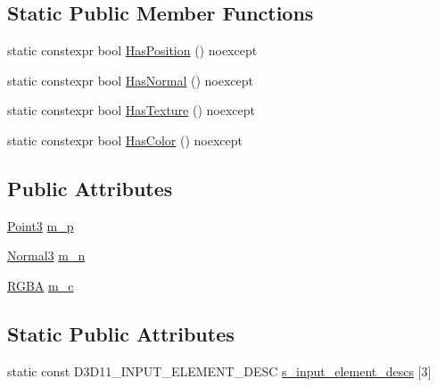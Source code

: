 \subsection*{Static Public Member Functions}
\begin{DoxyCompactItemize}
\item 
static constexpr bool \hyperlink{structmage_1_1rendering_1_1_vertex_position_normal_color_a1a40ced9702b3aa3a8f32ea932448aa1}{Has\+Position} () noexcept
\item 
static constexpr bool \hyperlink{structmage_1_1rendering_1_1_vertex_position_normal_color_a663883aaff79837d1abb1c5cb54d2340}{Has\+Normal} () noexcept
\item 
static constexpr bool \hyperlink{structmage_1_1rendering_1_1_vertex_position_normal_color_aef3b7dd4f11d7f2a78fe29c49b8bf6f5}{Has\+Texture} () noexcept
\item 
static constexpr bool \hyperlink{structmage_1_1rendering_1_1_vertex_position_normal_color_ae1d38a1d2e3f546c475849ec360f5317}{Has\+Color} () noexcept
\end{DoxyCompactItemize}
\subsection*{Public Attributes}
\begin{DoxyCompactItemize}
\item 
\hyperlink{structmage_1_1_point3}{Point3} \hyperlink{structmage_1_1rendering_1_1_vertex_position_normal_color_ad89961e1a0b0bd97f580a34709e4e05f}{m\+\_\+p}
\item 
\hyperlink{structmage_1_1_normal3}{Normal3} \hyperlink{structmage_1_1rendering_1_1_vertex_position_normal_color_abf35d5cb0057f76dbd6f153ee0f412f4}{m\+\_\+n}
\item 
\hyperlink{structmage_1_1_r_g_b_a}{R\+G\+BA} \hyperlink{structmage_1_1rendering_1_1_vertex_position_normal_color_a41410eb9dab6e73b59aac40b69637c05}{m\+\_\+c}
\end{DoxyCompactItemize}
\subsection*{Static Public Attributes}
\begin{DoxyCompactItemize}
\item 
static const D3\+D11\+\_\+\+I\+N\+P\+U\+T\+\_\+\+E\+L\+E\+M\+E\+N\+T\+\_\+\+D\+E\+SC \hyperlink{structmage_1_1rendering_1_1_vertex_position_normal_color_adadf05a78d26b87baef8a9c3cb80ae54}{s\+\_\+input\+\_\+element\+\_\+descs} \mbox{[}3\mbox{]}
\end{DoxyCompactItemize}



